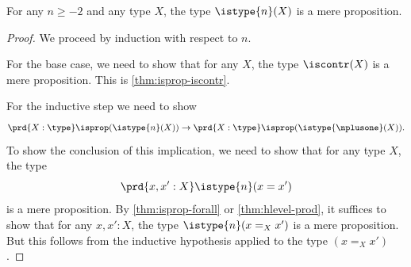 %
\begin{thm}\label{thm:isaprop-isofhlevel}
 For any $n \geq -2$ and any type $X$, the type $\istype{n}(X)$ is a mere proposition.
\end{thm}

\begin{proof}
  We proceed by induction with respect to $n$.

 For the base case, we need to show that for any $X$, the type $\iscontr(X)$ is a mere proposition.
 This is \cref{thm:isprop-iscontr}.

For the inductive step we need to show
\[\prd{X : \type} \isprop (\istype{n}(X)) \to \prd{X : \type} \isprop (\istype{\nplusone}(X)). \]
To show the conclusion of this implication, we need to show that for any type $X$, the type
\[\prd{x, x' : X}\istype{n}(x = x')\]
is a mere proposition. By \cref{thm:isprop-forall} or \cref{thm:hlevel-prod}, it suffices to show that for any $x, x' : X$, the type $\istype{n}(x =_X x')$ is a mere
proposition.
But this follows from the inductive hypothesis applied to the type $(x =_X x')$.
\end{proof}
